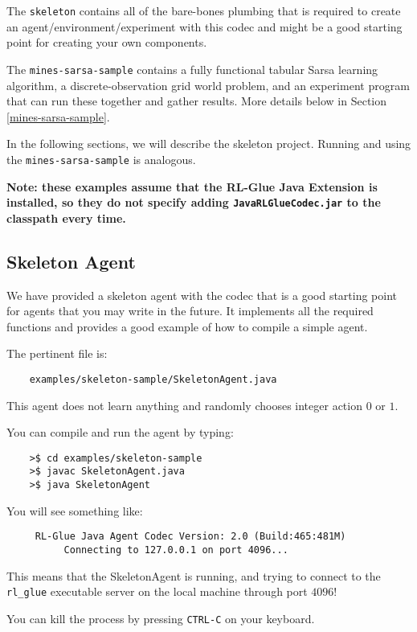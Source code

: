 \documentclass[11pt]{article}
\begin{document}
The \texttt{skeleton} contains all of the bare-bones plumbing that is required to create an agent/environment/experiment with this codec and might be a good starting point for creating your own components.

The \texttt{mines-sarsa-sample} contains a fully functional tabular Sarsa learning algorithm, a discrete-observation grid world problem, and an experiment program that can run these together and gather results.  More details below in Section \ref{mines-sarsa-sample}.

In the following sections, we will describe the skeleton project.  Running and using the \texttt{mines-sarsa-sample} is analogous.

\textbf{Note: these examples assume that the RL-Glue Java Extension is installed, so they do not specify adding \texttt{JavaRLGlueCodec.jar} to the classpath every time.}

\subsection{Skeleton Agent}
\label{sec:agent}
We have provided a skeleton agent with the codec that is a good starting point for agents that you may write in the future.
It implements all the required functions and provides a good example of how to compile a simple agent.

The pertinent file is:
\begin{verbatim}
	examples/skeleton-sample/SkeletonAgent.java
\end{verbatim}

This agent does not learn anything and randomly chooses integer action $0$ or $1$.  

You can compile and run the agent by typing:
\begin{verbatim}
	>$ cd examples/skeleton-sample
	>$ javac SkeletonAgent.java
	>$ java SkeletonAgent
\end{verbatim}

You will see something like:
\begin{verbatim}
     RL-Glue Java Agent Codec Version: 2.0 (Build:465:481M)
          Connecting to 127.0.0.1 on port 4096...
\end{verbatim}

This means that the SkeletonAgent is running, and trying to connect to the \texttt{rl\_glue} executable server on the local machine through port $4096$! 

You can kill the process by pressing \texttt{CTRL-C} on your keyboard.
\end{document}
